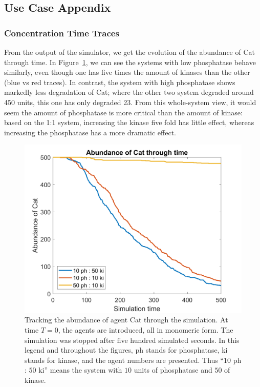 \subsection*{Use Case Appendix}

\subsubsection*{Concentration Time Traces}
From the output of the simulator, we get the evolution of the abundance of
Cat through time. In Figure~\ref{F0}, we can see the systems with low phosphatase
behave similarly, even though one has five times the amount of kinases
than the other (blue vs red traces). In contrast, the system with high
phosphatase shows markedly less degradation of Cat; where the other
two system degraded around 450 units, this one has only degraded
23. From this whole-system view, it would seem the amount of
phosphatase is more critical than the amount of kinase: based on the
1:1 system, increasing the kinase five fold has little effect, whereas
increasing the phosphatase has a more dramatic effect.

\begin{figure}[h]
  \centering
  \includegraphics[width=\columnwidth]{wnt/F0_abundance_of_cat_through_time}
  \caption{Tracking the abundance of agent Cat through the
    simulation. At time $T=0$, the agents are introduced, all in
    monomeric form. The simulation was stopped after five hundred
    simulated seconds. In this legend and throughout the figures, ph
    stands for phosphatase, ki stands for kinase, and the agent
    numbers are presented. Thus ``$10$ ph : $50$ ki'' means the system
    with $10$ units of phosphatase and $50$ of kinase.}
  \label{F0}
\end{figure}


